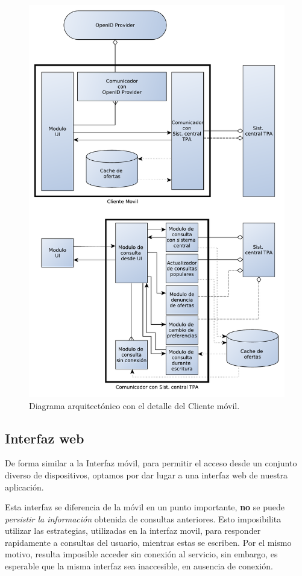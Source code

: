\begin{figure}[H]
	\centering
	\includegraphics[width=\textwidth]{graficos/arch/Cliente_movil.pdf}
	\caption{Diagrama arquitectónico con el detalle del \textsf{Cliente móvil}.}
\end{figure}

\subsection{Interfaz web}

De forma similar a la Interfaz móvil, para permitir el acceso desde un conjunto diverso de dispositivos, optamos por dar lugar a una interfaz web de nuestra aplicación.

Esta interfaz se diferencia de la móvil en un punto importante, \textbf{no} se puede \emph{persistir la información} obtenida de consultas anteriores. Esto imposibilita utilizar las estrategias, utilizadas en la interfaz movil, para responder rapidamente a consultas del usuario, mientras estas se escriben. Por el mismo motivo, resulta imposible acceder sin conexión al servicio, sin embargo, es esperable que la misma interfaz sea inaccesible, en ausencia de conexión.

